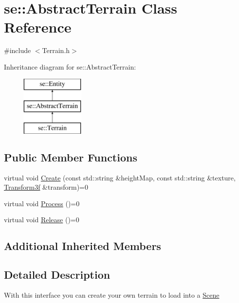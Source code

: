 \hypertarget{classse_1_1_abstract_terrain}{}\section{se\+:\+:Abstract\+Terrain Class Reference}
\label{classse_1_1_abstract_terrain}


{\ttfamily \#include $<$Terrain.\+h$>$}

Inheritance diagram for se\+:\+:Abstract\+Terrain\+:\begin{figure}[H]
\begin{center}
\leavevmode
\includegraphics[height=3.000000cm]{classse_1_1_abstract_terrain}
\end{center}
\end{figure}
\subsection*{Public Member Functions}
\begin{DoxyCompactItemize}
\item 
virtual void \mbox{\hyperlink{classse_1_1_abstract_terrain_ab064ca434de133a78a0899fe53caea99}{Create}} (const std\+::string \&height\+Map, const std\+::string \&texture, \mbox{\hyperlink{classse_1_1_transform3f}{Transform3f}} \&transform)=0
\item 
virtual void \mbox{\hyperlink{classse_1_1_abstract_terrain_af2f0249eead2b62a82baa2ecbb52efeb}{Process}} ()=0
\item 
virtual void \mbox{\hyperlink{classse_1_1_abstract_terrain_aeee5b6c81be6aee211819b8d79718bf5}{Release}} ()=0
\end{DoxyCompactItemize}
\subsection*{Additional Inherited Members}


\subsection{Detailed Description}
With this interface you can create your own terrain to load into a \mbox{\hyperlink{classse_1_1_scene}{Scene}} 

